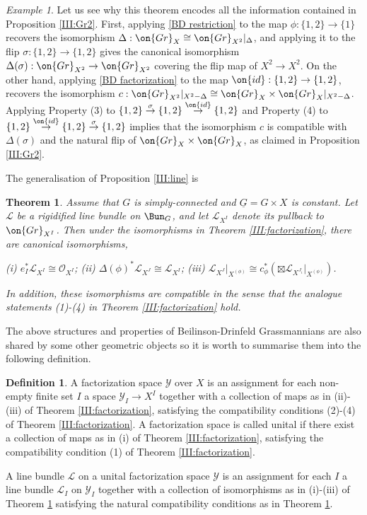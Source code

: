 \documentclass[]{pcmi}
\theoremstyle{plain}
\newtheorem{thm}[equation]{Theorem}
\theoremstyle{remark}
\newtheorem{ex}[equation]{Example}
\theoremstyle{definition}
\newtheorem{dfn}[equation]{Definition}
\newcommand{\mL}{{\mathcal L}}
\newcommand{\mO}{{\mathcal O}}
\newcommand{\mY}{{\mathcal Y}}
\newcommand{\Aut}{{\on{Aut}}}
\newcommand{\Gr}{{\on{Gr}}}
\newcommand{\id}{{\on{id}}}
\begin{document}
\begin{ex}\label{FA ex}
Let us see why this theorem encodes all the information contained in Proposition \ref{III:Gr2}. First, applying \eqref{BD restriction} to the map $\phi:\{1,2\}\to \{1\}$ recovers the isomorphism $\Delta: \Gr_X\cong \Gr_{X^2}|_{\Delta}$, and applying it to the flip $\sigma:\{1,2\}\to \{1,2\}$ gives the canonical isomorphism $\Delta(\sigma):\Gr_{X^2}\to \Gr_{X^2}$ covering the flip map of $X^2\to X^2$.
On the other hand, applying \eqref{BD factorization} to the map
$\id: \{1,2\}\to \{1,2\}$, 
recovers the isomorphism $c:\Gr_{X^2}|_{X^2-\Delta}\cong \Gr_X\times\Gr_X|_{X^2-\Delta}$. 
Applying Property (3) to $\{1,2\}\stackrel{\sigma}{\to}\{1,2\}\stackrel{\id}{\to}\{1,2\}$ and Property (4) to $\{1,2\}\stackrel{\id}{\to}\{1,2\}\stackrel{\sigma}{\to}\{1,2\}$ implies that the isomorphism $c$ is compatible with $\Delta(\sigma)$ and the natural flip of $\Gr_{X}\times\Gr_X$, as claimed in Proposition \ref{III:Gr2}.
\end{ex}




The generalisation of Proposition \ref{III:line} is
\begin{thm}\label{III:factor line}
Assume that $G$ is simply-connected and $\underline G=G\times X$ is constant.
Let $\mL$ be a rigidified line bundle on $\Bun_{G}$, and let $\mL_{X^I}$ denote its pullback to $\Gr_{X^I}$. Then under the isomorphisms in Theorem \ref{III:factorization}, there are canonical isomorphisms,

(i) $e_I^*\mL_{X^I}\cong \mO_{X^I}$; (ii) $\Delta(\phi)^*\mL_{X^J}\cong \mL_{X^I}$; (iii) $\mL_{X^J}|_{X^{(\phi)}}\cong c_\phi^*(\boxtimes \mL_{X^{J_i}}|_{X^{(\phi)}})$.

In addition, these isomorphisms are compatible in the sense that the analogue statements (1)-(4) in Theorem \ref{III:factorization} hold. 
\end{thm}

The above structures and properties of Beilinson-Drinfeld Grassmannians are also shared by some other geometric objects so it is worth to summarise them into the following definition.
\begin{dfn}\label{FA space}
A factorization space $\mY$ over $X$ is an assignment for each non-empty  finite set $I$ a space $\mY_I\to X^I$ together with a collection of maps as in (ii)-(iii) of Theorem \ref{III:factorization}, satisfying the compatibility conditions (2)-(4) of Theorem \ref{III:factorization}. A factorization space is called unital if there exist a collection of maps as in (i) of Theorem \ref{III:factorization}, satisfying the compatibility condition (1) of Theorem \ref{III:factorization}.

A line bundle $\mL$ on a unital factorization space $\mY$ is an assignment for each $I$  a line bundle $\mL_I$ on $\mY_I$ together with a collection of isomorphisms as in (i)-(iii) of Theorem \ref{III:factor line} satisfying the natural compatibility conditions as in Theorem \ref{III:factor line}.
\end{dfn}
\end{document}
